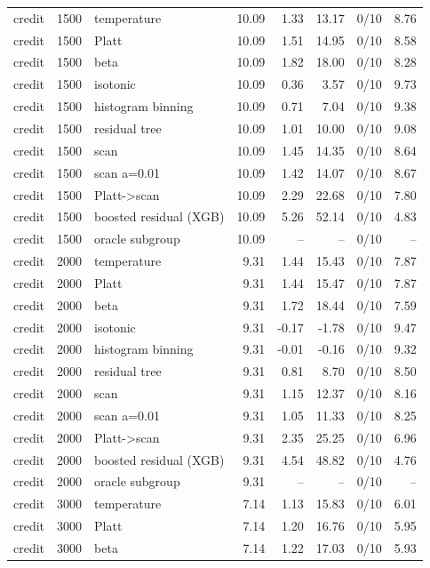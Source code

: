 \begin{tabular}{lllrrrlr}
credit & 1500 & temperature & 10.09 & 1.33 & 13.17 & 0/10 & 8.76 \\
credit & 1500 & Platt & 10.09 & 1.51 & 14.95 & 0/10 & 8.58 \\
credit & 1500 & beta & 10.09 & 1.82 & 18.00 & 0/10 & 8.28 \\
credit & 1500 & isotonic & 10.09 & 0.36 & 3.57 & 0/10 & 9.73 \\
credit & 1500 & histogram binning & 10.09 & 0.71 & 7.04 & 0/10 & 9.38 \\
credit & 1500 & residual tree & 10.09 & 1.01 & 10.00 & 0/10 & 9.08 \\
credit & 1500 & scan & 10.09 & 1.45 & 14.35 & 0/10 & 8.64 \\
credit & 1500 & scan a=0.01 & 10.09 & 1.42 & 14.07 & 0/10 & 8.67 \\
credit & 1500 & Platt->scan & 10.09 & 2.29 & 22.68 & 0/10 & 7.80 \\
credit & 1500 & boosted residual (XGB) & 10.09 & 5.26 & 52.14 & 0/10 & 4.83 \\
credit & 1500 & oracle subgroup & 10.09 & -- & -- & 0/10 & -- \\
credit & 2000 & temperature & 9.31 & 1.44 & 15.43 & 0/10 & 7.87 \\
credit & 2000 & Platt & 9.31 & 1.44 & 15.47 & 0/10 & 7.87 \\
credit & 2000 & beta & 9.31 & 1.72 & 18.44 & 0/10 & 7.59 \\
credit & 2000 & isotonic & 9.31 & -0.17 & -1.78 & 0/10 & 9.47 \\
credit & 2000 & histogram binning & 9.31 & -0.01 & -0.16 & 0/10 & 9.32 \\
credit & 2000 & residual tree & 9.31 & 0.81 & 8.70 & 0/10 & 8.50 \\
credit & 2000 & scan & 9.31 & 1.15 & 12.37 & 0/10 & 8.16 \\
credit & 2000 & scan a=0.01 & 9.31 & 1.05 & 11.33 & 0/10 & 8.25 \\
credit & 2000 & Platt->scan & 9.31 & 2.35 & 25.25 & 0/10 & 6.96 \\
credit & 2000 & boosted residual (XGB) & 9.31 & 4.54 & 48.82 & 0/10 & 4.76 \\
credit & 2000 & oracle subgroup & 9.31 & -- & -- & 0/10 & -- \\
credit & 3000 & temperature & 7.14 & 1.13 & 15.83 & 0/10 & 6.01 \\
credit & 3000 & Platt & 7.14 & 1.20 & 16.76 & 0/10 & 5.95 \\
credit & 3000 & beta & 7.14 & 1.22 & 17.03 & 0/10 & 5.93 \\

\end{tabular}

